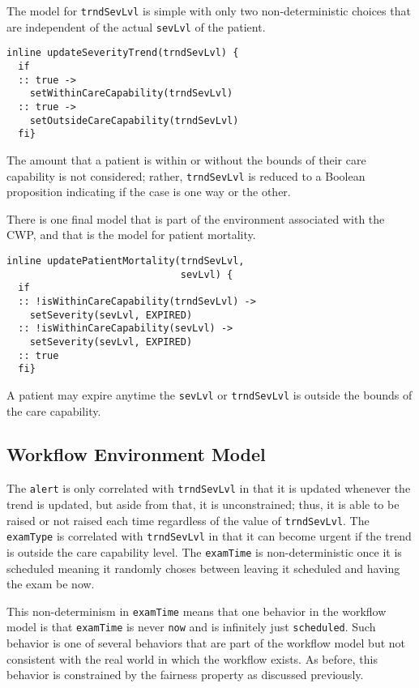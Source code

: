 The model for \texttt{trndSevLvl} is simple with only two non-deterministic choices that are independent of the actual \texttt{sevLvl} of the patient. 
%
{\small
\begin{lstlisting}[style=myPromela]
inline updateSeverityTrend(trndSevLvl) {
  if
  :: true -> 
    setWithinCareCapability(trndSevLvl)
  :: true -> 
    setOutsideCareCapability(trndSevLvl)
  fi}
\end{lstlisting}
}
%
\noindent The amount that a patient is within or without the bounds of their care capability is not considered; rather, \texttt{trndSevLvl} is reduced to a Boolean proposition indicating if the case is one way or the other.

There is one final model that is part of the environment associated with the CWP, and that is the model for patient mortality. 
%
{\small
\begin{lstlisting}[style=myPromela]
inline updatePatientMortality(trndSevLvl, 
                              sevLvl) {
  if
  :: !isWithinCareCapability(trndSevLvl) -> 
    setSeverity(sevLvl, EXPIRED)
  :: !isWithinCareCapability(sevLvl) -> 
    setSeverity(sevLvl, EXPIRED)
  :: true
  fi}
\end{lstlisting}
}
%
\noindent A patient may expire anytime the \texttt{sevLvl} or \texttt{trndSevLvl} is outside the bounds of the care capability.

\subsection{Workflow Environment Model}

\begin{comment}
The workflow itself has state not just for where the tokens are located as discussed is \secref{sec:bpmn}. It makes decisions at different points based on the values of \texttt{alert}, \texttt{examType}, and \texttt{examTime}. Their values are updated by their associated tasks in the workflow, but how the values evolve over time is not specified. As such, they are modeled as inputs provided by the environment which are sampled when their associated tasks are activated.
\end{comment}

The \texttt{alert} is only correlated with \texttt{trndSevLvl} in that it is updated whenever the trend is updated, but aside from that, it is unconstrained; thus, it is able to be raised or not raised each time regardless of the value of \texttt{trndSevLvl}. The \texttt{examType} is correlated with \texttt{trndSevLvl} in that it can become urgent if the trend is outside the care capability level. The \texttt{examTime} is non-deterministic once it is scheduled meaning it randomly choses between leaving it scheduled and having the exam be now.

This non-determinism in \texttt{examTime} means that one behavior in the workflow model is that \texttt{examTime} is never \texttt{now} and is infinitely just \texttt{scheduled}. Such behavior is one of several behaviors that are part of the workflow model but not consistent with the real world in which the workflow exists. As before, this behavior is constrained by the fairness property as discussed previously.
